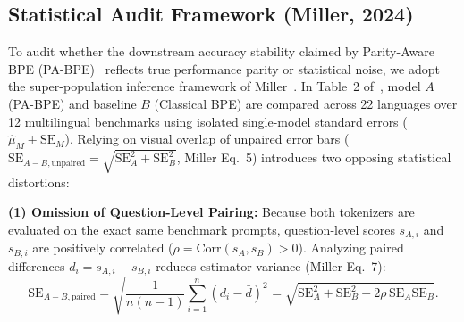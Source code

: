 

\subsection{Statistical Audit Framework (Miller, 2024)}
\label{sec:stat_methodology}

To audit whether the downstream accuracy stability claimed by Parity-Aware BPE (PA-BPE)~\cite{foroutan2026parity} reflects true performance parity or statistical noise, we adopt the super-population inference framework of Miller~\cite{miller2024adding}. In Table~2 of~\cite{foroutan2026parity}, model $A$ (PA-BPE) and baseline $B$ (Classical BPE) are compared across 22 languages over 12 multilingual benchmarks using isolated single-model standard errors ($\hat{\mu}_M \pm \mathrm{SE}_M$). Relying on visual overlap of unpaired error bars ($\mathrm{SE}_{A-B,\mathrm{unpaired}} = \sqrt{\mathrm{SE}_A^2 + \mathrm{SE}_B^2}$, Miller Eq.~5) introduces two opposing statistical distortions:

\textbf{(1) Omission of Question-Level Pairing:} Because both tokenizers are evaluated on the exact same benchmark prompts, question-level scores $s_{A,i}$ and $s_{B,i}$ are positively correlated ($\rho = \mathrm{Corr}(s_A, s_B) > 0$). Analyzing paired differences $d_i = s_{A,i} - s_{B,i}$ reduces estimator variance (Miller Eq.~7):
\begin{equation}
\mathrm{SE}_{A-B,\mathrm{paired}} = \sqrt{\frac{1}{n(n-1)}\sum_{i=1}^{n}(d_i - \bar{d})^2} = \sqrt{\mathrm{SE}_A^2 + \mathrm{SE}_B^2 - 2\rho\,\mathrm{SE}_A\mathrm{SE}_B}.
\label{eq:paired_se}
\end{equation}

